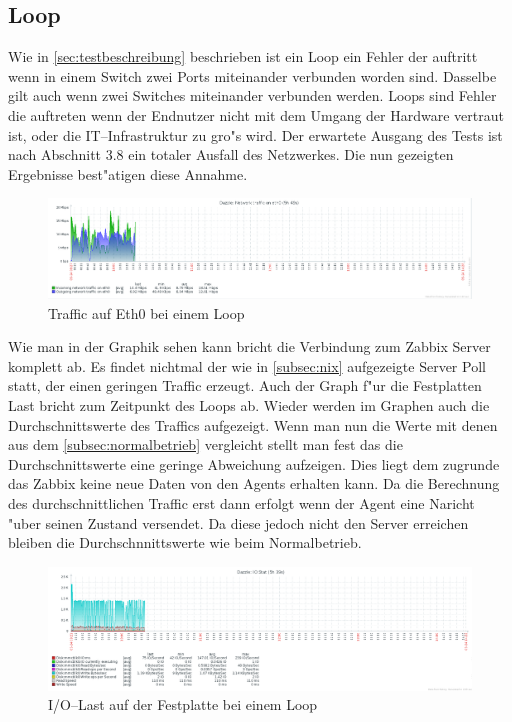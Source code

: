 \subsection{Loop}

\label{subsec:loop}
Wie in \cref{sec:testbeschreibung} beschrieben ist ein Loop ein Fehler der auftritt wenn in einem Switch zwei Ports miteinander verbunden worden sind. %
Dasselbe gilt auch wenn zwei Switches miteinander verbunden werden. Loops sind Fehler die auftreten wenn der Endnutzer nicht mit dem Umgang der Hardware vertraut ist, %
oder die IT--Infrastruktur zu gro"s wird. %
Der erwartete Ausgang des Tests ist nach Abschnitt 3.8 \autocite{book:schreiner} ein totaler Ausfall des Netzwerkes. Die nun gezeigten Ergebnisse best"atigen diese %
Annahme.  

\begin{figure}[htbp]
\centering
\includegraphics*[width=0.9\linewidth]{Abb/ZabbixDazzle/Loop/DazzleLoop}

\caption{Traffic auf Eth0 bei einem Loop}
\label{fig:Eth0DazzleLoop}
\end{figure}

Wie man in der Graphik sehen kann bricht die Verbindung zum Zabbix Server komplett ab. Es findet nichtmal der wie in \cref{subsec:nix} aufgezeigte Server Poll statt, %
der einen geringen Traffic erzeugt. %
Auch der Graph f"ur die Festplatten Last bricht zum Zeitpunkt des Loops ab. Wieder werden im Graphen auch die Durchschnittswerte des Traffics aufgezeigt. %
Wenn man nun die Werte mit denen aus dem \cref{subsec:normalbetrieb} vergleicht stellt man fest das die Durchschnittswerte eine geringe Abweichung aufzeigen. %
Dies liegt dem zugrunde das Zabbix keine neue Daten von den Agents erhalten kann. Da die Berechnung des durchschnittlichen Traffic erst dann erfolgt wenn %
der Agent eine Naricht "uber seinen Zustand versendet. Da diese jedoch nicht den Server erreichen bleiben die Durchschnnittswerte wie beim Normalbetrieb. %

\begin{figure}[htbp]
\centering
\includegraphics*[width=0.9\linewidth]{Abb/ZabbixDazzle/Loop/IoStatDazzleLoop}

\caption{I/O--Last auf der Festplatte bei einem Loop}
\label{fig:IoStatDazzleLoop}
\end{figure}

